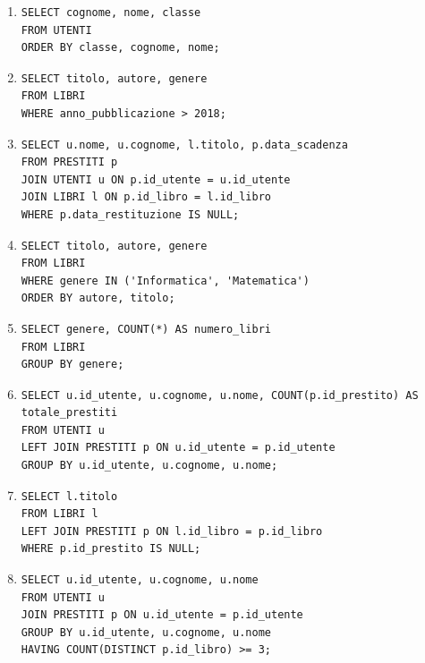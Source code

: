 \documentclass[a4paper,12pt]{article}
\begin{document}
	\begin{enumerate}
		\item
\begin{verbatim}
SELECT cognome, nome, classe
FROM UTENTI
ORDER BY classe, cognome, nome;
\end{verbatim}

		\item
\begin{verbatim}
SELECT titolo, autore, genere
FROM LIBRI
WHERE anno_pubblicazione > 2018;
\end{verbatim}

		\item
\begin{verbatim}
SELECT u.nome, u.cognome, l.titolo, p.data_scadenza
FROM PRESTITI p
JOIN UTENTI u ON p.id_utente = u.id_utente
JOIN LIBRI l ON p.id_libro = l.id_libro
WHERE p.data_restituzione IS NULL;
\end{verbatim}

		\item
\begin{verbatim}
SELECT titolo, autore, genere
FROM LIBRI
WHERE genere IN ('Informatica', 'Matematica')
ORDER BY autore, titolo;
\end{verbatim}

		\item
\begin{verbatim}
SELECT genere, COUNT(*) AS numero_libri
FROM LIBRI
GROUP BY genere;
\end{verbatim}

		\item
\begin{verbatim}
SELECT u.id_utente, u.cognome, u.nome, COUNT(p.id_prestito) AS totale_prestiti
FROM UTENTI u
LEFT JOIN PRESTITI p ON u.id_utente = p.id_utente
GROUP BY u.id_utente, u.cognome, u.nome;
\end{verbatim}

		\item
\begin{verbatim}
SELECT l.titolo
FROM LIBRI l
LEFT JOIN PRESTITI p ON l.id_libro = p.id_libro
WHERE p.id_prestito IS NULL;
\end{verbatim}

		\item
\begin{verbatim}
SELECT u.id_utente, u.cognome, u.nome
FROM UTENTI u
JOIN PRESTITI p ON u.id_utente = p.id_utente
GROUP BY u.id_utente, u.cognome, u.nome
HAVING COUNT(DISTINCT p.id_libro) >= 3;
\end{verbatim}


\end{enumerate}
\end{document}
